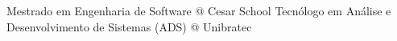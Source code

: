 %
%
%


\begin{scholarship}
					{Mestrado em Engenharia de Software @ Cesar School}
					{Tecnólogo em Análise e Desenvolvimento de Sistemas (ADS) @ Unibratec}
\end{scholarship}